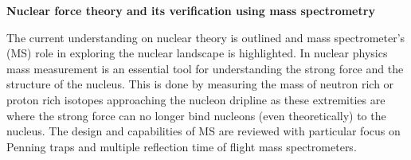 \documentclass[a4paper]{article}
\begin{document}
\begin{center}
    \Huge \textbf{Nuclear force theory and its verification using mass spectrometry}
\end{center}

\vspace{-0.5em}

\begin{center}
    \begin{adjustwidth}{3em}{3em}
        The current understanding on nuclear theory is outlined and mass spectrometer’s (MS) role in exploring the nuclear landscape is highlighted. In nuclear physics mass measurement is an essential tool for understanding the strong force and the structure of the nucleus. This is done by measuring the mass of neutron rich or proton rich isotopes approaching the nucleon dripline as these extremities are where the strong force can no longer bind nucleons (even theoretically) to the nucleus. The design and capabilities of MS are reviewed with particular focus on Penning traps and multiple reflection time of flight mass spectrometers.
    \end{adjustwidth}
\end{center}

\vspace{1em}

\begin{multicols}{2}

    
    
    
    
    
    
    
    \printbibliography

\end{multicols}
\end{document}
